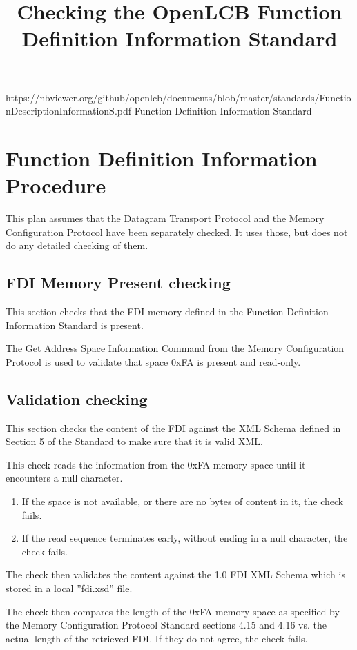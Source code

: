 

\title{Checking the OpenLCB Function Definition Information Standard}


\maketitle


\introductionCaveats
    {https://nbviewer.org/github/openlcb/documents/blob/master/standards/FunctionDescriptionInformationS.pdf}
    {Function Definition Information Standard}

\section{Function Definition Information Procedure}


This plan assumes that the Datagram Transport Protocol and the Memory Configuration Protocol 
have been separately checked. It uses those, but does not do any detailed checking of them.

\subsection{FDI Memory Present checking}

This section checks that the FDI memory defined in the Function 
Definition Information Standard is present.

The Get Address Space Information Command from the Memory Configuration Protocol
is used to validate that space 0xFA is present and read-only.

\subsection{Validation checking}

This section checks the content of the FDI against the XML Schema 
defined in Section 5 of the Standard to make sure that it is valid XML. 

This check reads the information from the 0xFA memory space
until it encounters a null character.
\begin{enumerate}
\item If the space is not available, or there are no bytes of content in it, the check fails.
\item If the read sequence terminates early, without ending in a null character, the check fails.
\end{enumerate}
 
The check then validates the content against the 1.0 FDI XML Schema
which is stored in a local ”fdi.xsd” file.

The check then compares the length of the 0xFA memory space 
as specified by the Memory Configuration Protocol Standard sections 4.15 and 4.16
vs. the actual length of the retrieved FDI.
If they do not agree, the check fails.

  
